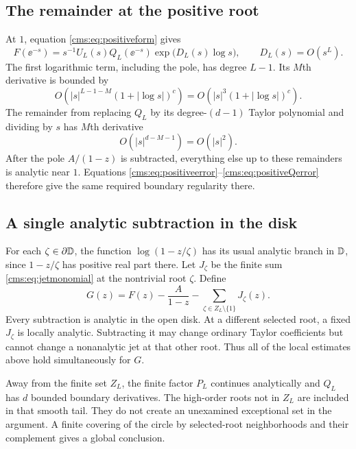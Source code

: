 \subsection{The remainder at the positive root}
At $1$, equation \eqref{cms:eq:positiveform} gives
\[
F(\ee^{-s})=s^{-1}U_L(s)Q_L(\ee^{-s})
 \exp\bigl(D_L(s)\log s\bigr),\qquad D_L(s)=O(s^L).
\]
The first logarithmic term, including the pole, has degree $L-1$. Its $M$th derivative is bounded by
\begin{equation}\label{cms:eq:positiveerror}
O\!\left(|s|^{L-1-M}(1+|\log s|)^c\right)
=O\!\left(|s|^3(1+|\log s|)^c\right).
\end{equation}
The remainder from replacing $Q_L$ by its degree-$(d-1)$ Taylor polynomial and dividing by $s$ has $M$th derivative
\begin{equation}\label{cms:eq:positiveQerror}
O(|s|^{d-M-1})=O(|s|^2).
\end{equation}
After the pole $A/(1-z)$ is subtracted, everything else up to these remainders is analytic near $1$. Equations \eqref{cms:eq:positiveerror}--\eqref{cms:eq:positiveQerror} therefore give the same required boundary regularity there.

\subsection{A single analytic subtraction in the disk}
For each $\zeta\in\partial\mathbb D$, the function $\log(1-z/\zeta)$ has its usual analytic branch in $\mathbb D$, since $1-z/\zeta$ has positive real part there. Let $J_\zeta$ be the finite sum \eqref{cms:eq:jetmonomial} at the nontrivial root $\zeta$. Define
\begin{equation}\label{cms:eq:G}
G(z)=F(z)-\frac{A}{1-z}-\sum_{\zeta\in Z_L\setminus\{1\}}J_\zeta(z).
\end{equation}
Every subtraction is analytic in the open disk. At a different selected root, a fixed $J_\zeta$ is locally analytic. Subtracting it may change ordinary Taylor coefficients but cannot change a nonanalytic jet at that other root. Thus all of the local estimates above hold simultaneously for $G$.

Away from the finite set $Z_L$, the finite factor $P_L$ continues analytically and $Q_L$ has $d$ bounded boundary derivatives. The high-order roots not in $Z_L$ are included in that smooth tail. They do not create an unexamined exceptional set in the argument. A finite covering of the circle by selected-root neighborhoods and their complement gives a global conclusion.

